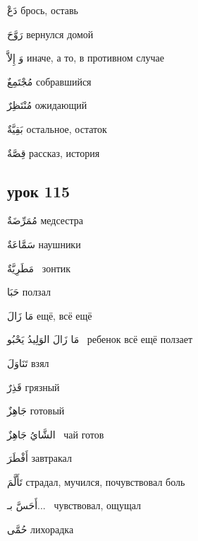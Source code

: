 \documentclass[a5paper]{article}
\newcommand\textstyleDropCaps[1]{#1}
\newcommand\textstyleCaptioncharacters[1]{#1}
\begin{document}
\textstyleCaptioncharacters{دَعْ }\textstyleDropCaps{брось, оставь ‎}

\textstyleCaptioncharacters{رَوَّحَ }\textstyleDropCaps{вернулся домой‎}

\textstyleCaptioncharacters{وَ إِلاَّ }\textstyleDropCaps{иначе, а то, в против­ном случае‎}

\textstyleCaptioncharacters{مُجْتَمِعٌ }\textstyleDropCaps{собравшийся ‎}

\textstyleCaptioncharacters{مُنْتَظِرٌ }\textstyleDropCaps{ожидающий ‎}

\textstyleCaptioncharacters{بَقِيَّةٌ }\textstyleDropCaps{остальное, остаток ‎}

\textstyleCaptioncharacters{قِصَّةٌ }\textstyleDropCaps{рассказ, история‎}

\subsection[урок 115‎]{\textstyleDropCaps{урок 115‎}}
\textstyleCaptioncharacters{مُمَرِّضَةٌ }\textstyleDropCaps{медсестра ‎}

\textstyleCaptioncharacters{سَمَّاعَةٌ }\textstyleDropCaps{наушники ‎}

\textstyleCaptioncharacters{مَطَرِيَّةٌ \ }\textstyleDropCaps{зонтик‎}

\textstyleCaptioncharacters{حَبَا }\textstyleDropCaps{ползал ‎}

\textstyleCaptioncharacters{مَا زَالَ }\textstyleDropCaps{ещё, всё ещё‎}

\textstyleCaptioncharacters{مَا زَالَ الوَلِيدُ يَحْبُو \ }\textstyleDropCaps{ребенок всё ещё ползает ‎}

\textstyleCaptioncharacters{تَنَاوَلَ }\textstyleDropCaps{взял‎}

\textstyleCaptioncharacters{قَذِرٌ }\textstyleDropCaps{грязный‎}

\textstyleCaptioncharacters{جَاهِزٌ }\textstyleDropCaps{готовый‎}

\textstyleCaptioncharacters{الشَّايُ جَاهِزٌ \ }\textstyleDropCaps{чай готов‎}

\textstyleCaptioncharacters{أَفْطَرَ }\textstyleDropCaps{завтракал‎}

\textstyleCaptioncharacters{تَأَلَّمَ }\textstyleDropCaps{страдал, мучился, по­чувствовал боль‎}

\textstyleCaptioncharacters{أَحَسَّ بـ... \ }\textstyleDropCaps{чувствовал, ощущал‎}

\textstyleCaptioncharacters{حُمَّى }\textstyleDropCaps{лихорадка‎}
\end{document}
